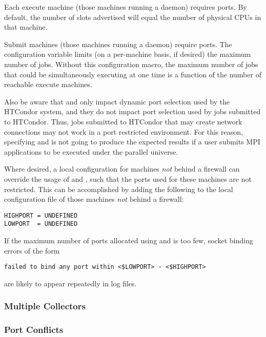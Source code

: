 Each execute machine (those machines running a  daemon)
requires
ports.
By default, the number of slots advertised
will equal the number of physical CPUs in that machine.

Submit machines (those machines running a  daemon)
require
 ports.
The configuration variable 
limits (on a per-machine basis, if desired)
the maximum number of jobs.
Without this configuration macro,
the maximum number of jobs that could be simultaneously
executing at one time
is a function of the number of reachable execute machines. 

Also be aware that  and 
only impact dynamic port selection used by the HTCondor system,
and they do not impact port selection used by jobs submitted to HTCondor.
Thus, jobs submitted to HTCondor that may create
network connections may not work in a port restricted environment.
For this reason, specifying  and 
is not going to produce the
expected results if a user submits MPI applications to be executed under
the parallel universe.

Where desired, a local
configuration for machines \emph{not} behind a firewall
can override the usage of  and ,
such that the ports used for these machines are not restricted.
This can be accomplished by adding the following to the
local configuration file of those machines \emph{not}
behind a firewall:
\begin{verbatim}
HIGHPORT = UNDEFINED
LOWPORT  = UNDEFINED
\end{verbatim}


If the maximum number of ports allocated using 
 and 
is too few,
socket binding errors of the form
\footnotesize
\begin{verbatim}
failed to bind any port within <$LOWPORT> - <$HIGHPORT>
\end{verbatim}
\normalsize
are likely to appear repeatedly in log files.


\subsubsection{\label{sec:Ports-MultipleCollectors}Multiple Collectors}
\Todo


\subsubsection{\label{sec:Ports-Conflicts}Port Conflicts}
\Todo

